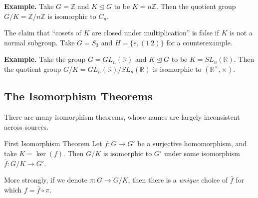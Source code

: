 \textbf{Example.} Take $G = \mathbb{Z}$ and $K \unlhd G$ to be $K = n \mathbb{Z}$.  Then the quotient group $G/K = \mathbb{Z} / n \mathbb{Z}$ is isomorphic to $C_n$.

\begin{remark}
    The claim that ``cosets of $K$ are closed under multiplication'' is false if $K$ is not a normal subgroup.  Take $G = S_3$ and $H = \{e, (1 \ 2)\}$ for a counterexample.
\end{remark}

\textbf{Example.} Take the group $G = GL_n(\mathbb{R})$ and $K \unlhd G$ to be $K = SL_n(\mathbb{R})$.  Then the quotient group $G/K = GL_n(\mathbb{R})/SL_n(\mathbb{R})$ is isomorphic to $(\mathbb{R}^{\times}, \times)$.

\subsection{The Isomorphism Theorems}

There are many isomorphism theorems, whose names are largely inconsistent across sources.

\begin{theorem}{First Isomorphism Theorem}
    Let $f: G \to G'$ be a surjective homomorphism, and take $K = \ker(f)$.  Then $G/K$ is isomorphic to $G'$ under some isomorphism $\bar{f}: G/K \to G'$.
    
    More strongly, if we denote $\pi: G \to G/K$, then there is a \emph{unique} choice of $\bar{f}$ for which $f = \bar{f} \circ \pi$.
\end{theorem}

